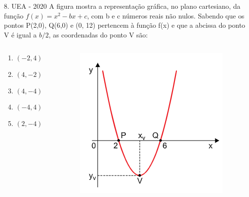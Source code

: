 \documentclass[11pt]{beamer}
\begin{document}
\begin{frame}{8. UEA - 2020}
    A figura mostra a representação gráfica, no plano cartesiano, da função $f(x) = x^{2}- bx+c$, com b e c números reais não nulos. Sabendo que os pontos P(2,0), Q(6,0) e (0, 12) pertencem à função f(x) e que a abcissa do ponto V é igual a ${b}/{2}$, as coordenadas do ponto V são:

    \begin{columns}
        \begin{column}{0.4\textwidth}
            \begin{enumerate}[a]
                \item $(-2,4)$ 
                \item $(4,-2)$
                \item $(4,-4)$ %
                \item $(-4,4)$
                \item $(2,-4)$
            \end{enumerate}
        \end{column}

        \begin{column}{0.5\textwidth}
            \centering
            \includegraphics[width=0.8\linewidth]{imagens/uea-macro-2020.png}
        \end{column}
    \end{columns}
\end{frame}
\end{document}
